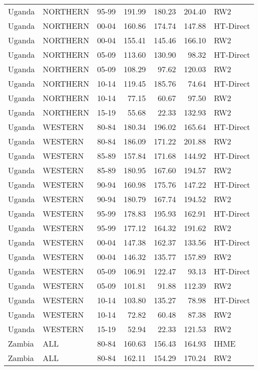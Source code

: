 \begin{longtable}{lllrrrl}
  Uganda & NORTHERN & 95-99 & 191.99 & 180.23 & 204.40 & RW2 \\ 
  Uganda & NORTHERN & 00-04 & 160.86 & 174.74 & 147.88 & HT-Direct \\ 
  Uganda & NORTHERN & 00-04 & 155.41 & 145.46 & 166.10 & RW2 \\ 
  Uganda & NORTHERN & 05-09 & 113.60 & 130.90 & 98.32 & HT-Direct \\ 
  Uganda & NORTHERN & 05-09 & 108.29 & 97.62 & 120.03 & RW2 \\ 
  Uganda & NORTHERN & 10-14 & 119.45 & 185.76 & 74.64 & HT-Direct \\ 
  Uganda & NORTHERN & 10-14 & 77.15 & 60.67 & 97.50 & RW2 \\ 
  Uganda & NORTHERN & 15-19 & 55.68 & 22.33 & 132.93 & RW2 \\ 
  Uganda & WESTERN & 80-84 & 180.34 & 196.02 & 165.64 & HT-Direct \\ 
  Uganda & WESTERN & 80-84 & 186.09 & 171.22 & 201.88 & RW2 \\ 
  Uganda & WESTERN & 85-89 & 157.84 & 171.68 & 144.92 & HT-Direct \\ 
  Uganda & WESTERN & 85-89 & 180.95 & 167.60 & 194.57 & RW2 \\ 
  Uganda & WESTERN & 90-94 & 160.98 & 175.76 & 147.22 & HT-Direct \\ 
  Uganda & WESTERN & 90-94 & 180.79 & 167.74 & 194.52 & RW2 \\ 
  Uganda & WESTERN & 95-99 & 178.83 & 195.93 & 162.91 & HT-Direct \\ 
  Uganda & WESTERN & 95-99 & 177.12 & 164.32 & 191.62 & RW2 \\ 
  Uganda & WESTERN & 00-04 & 147.38 & 162.37 & 133.56 & HT-Direct \\ 
  Uganda & WESTERN & 00-04 & 146.32 & 135.77 & 157.89 & RW2 \\ 
  Uganda & WESTERN & 05-09 & 106.91 & 122.47 & 93.13 & HT-Direct \\ 
  Uganda & WESTERN & 05-09 & 101.81 & 91.88 & 112.39 & RW2 \\ 
  Uganda & WESTERN & 10-14 & 103.80 & 135.27 & 78.98 & HT-Direct \\ 
  Uganda & WESTERN & 10-14 & 72.82 & 60.48 & 87.38 & RW2 \\ 
  Uganda & WESTERN & 15-19 & 52.94 & 22.33 & 121.53 & RW2 \\ 
  Zambia & ALL & 80-84 & 160.63 & 156.43 & 164.93 & IHME \\ 
  Zambia & ALL & 80-84 & 162.11 & 154.29 & 170.24 & RW2 \\ 

\end{longtable}

